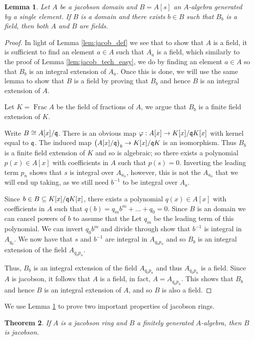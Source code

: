 \documentclass[12pt]{article}
\theoremstyle{plain}
\newtheorem{thm}{Theorem}[subsection] %
\newtheorem{lemma}[thm]{Lemma}
\theoremstyle{definition}
\begin{document}
\begin{lemma}\label{lem:jacob_tech_hard}
Let $A$ be a jacobson domain and $B = A[s]$ an $A$-algebra generated by a single element. If $B$ is a domain and there exists $b \in B$ such that $B_b$ is a field, then both $A$ and $B$ are fields.
\end{lemma}
\begin{proof}
In light of Lemma \ref{lem:jacob_def} we see that to show that $A$ is a field, it is sufficient to find an element $a \in A$ such that $A_a$ is a field, which similarly to the proof of Lemma \ref{lem:jacob_tech_easy}, we do by finding an element $a \in A$ so that $B_b$ is an integral extension of $A_a$. Once this is done, we will use the same lemma to show that $B$ is a field by proving that $B_b$ and hence $B$ is an integral extension of $A$.

Let $K = \operatorname{Frac}A$ be the field of fractions of $A$, we argue that $B_b$ is a finite field extension of $K$.

Write $B \cong A[x]/\frak{q}$. There is an obvious map $\varphi: A[x] \to K[x]/\frak{q}K[x]$ with kernel equal to $\frak{q}$. The induced map $\big(A[x]/\frak{q}\big)_b \to K[x]/\frak{q}K$ is an isomorphism. Thus $B_b$ is a finite field extension of $K$ and so is algebraic; so there exists a polynomial $p(x) \in A[x]$ with coefficients in $A$ such that $p(s) = 0$. Inverting the leading term $p_{n}$ shows that $s$ is integral over $A_{a_n}$, however, this is not the $A_{a_n}$ that we will end up taking, as we still need $b^{-1}$ to be integral over $A_{a}$.

Since $b \in B \subseteq K[x]/\frak{q}K[x]$, there exists a polynomial $q(x) \in A[x]$ with coefficients in $A$ such that $q(b) = q_mb^m + \hdots + q_0 = 0$. Since $B$ is an domain we can cancel powers of $b$ to assume that the Let $q_{m}$ be the leading term of this polynomial. We can invert $q_{0}b^m$ and divide through show that $b^{-1}$ is integral in $A_{q_0}$. We now have that $s$ and $b^{-1}$ are integral in $A_{q_0p_n}$ and so $B_b$ is an integral extension of the field $A_{q_0p_n}$.

Thus, $B_b$ is an integral extension of the field $A_{q_0p_n}$ and thus $A_{q_0p_n}$ is a field. Since $A$ is jacobson, it follows that $A$ is a field, in fact, $A = A_{q_0p_n}$. This shows that $B_b$ and hence $B$ is an integral extension of $A$, and so $B$ is also a field. 
\end{proof}
We use Lemma \ref{lem:jacob_tech_hard} to prove two important properties of jacobson rings.
\begin{thm}\label{thm:fin_gen_jacob}
If $A$ is a jacobson ring and $B$ a finitely generated $A$-algebra, then $B$ is jacobson.
\end{thm}
\end{document}
